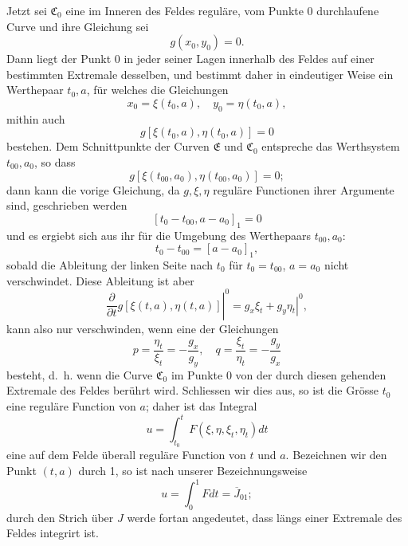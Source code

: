 \documentclass[11pt,a4paper,leqno]{article}
\begin{document}
Jetzt sei $\mathfrak{C}_0$ eine im Inneren des Feldes reguläre, vom Punkte 0 durchlaufene Curve und ihre Gleichung sei
\[
g(x_0,y_0)=0.
\]
Dann liegt der Punkt 0 in jeder seiner Lagen innerhalb des Feldes auf einer bestimmten Extremale desselben, und bestimmt daher in eindeutiger Weise ein Werthepaar $t_0,a$, für welches die Gleichungen
\[
x_0=\xi(t_0,a),\quad y_0=\eta(t_0,a),
\]
mithin auch
\[
g[\xi(t_0,a),\eta(t_0,a)]=0
\]
bestehen. Dem Schnittpunkte der Curven $\mathfrak{E}$ und $\mathfrak{C}_0$ entspreche das Werthsystem $t_{00},a_0$, so dass
\[
g[\xi(t_{00},a_0),\eta(t_{00},a_0)]=0;
\]
dann kann die vorige Gleichung, da $g,\xi,\eta$ reguläre Functionen ihrer Argumente sind, geschrieben werden
\[
[t_0-t_{00},a-a_0]_1=0
\]
und es ergiebt sich aus ihr für die Umgebung des Werthepaars $t_{00},a_0$:
\[
t_0-t_{00}=[a-a_0]_1,
\]
sobald die Ableitung der linken Seite nach $t_0$ für $t_0=t_{00}$, $a=a_0$ nicht verschwindet. Diese Ableitung ist aber
\[
\left.\frac{\partial}{\partial t}g[\xi(t,a),\eta(t,a)]\right|^0
=\left.g_x\xi_t+g_y\eta_t\right|^0,
\]
kann also nur verschwinden, wenn eine der Gleichungen
\[
p=\frac{\eta_t}{\xi_t}=-\frac{g_x}{g_y},
\quad q=\frac{\xi_t}{\eta_t}=-\frac{g_y}{g_x}
\]
besteht, d.~h. wenn die Curve $\mathfrak{C}_0$ im Punkte 0 von der durch diesen gehenden Extremale des Feldes berührt wird. Schliessen wir dies aus, so ist die Grösse $t_0$ eine reguläre Function von $a$; daher ist das Integral
\[
u=\int_{t_0}^{t}F(\xi,\eta,\xi_t,\eta_t)dt
\]
eine auf dem Felde überall reguläre Function von $t$ und $a$. Bezeichnen wir den Punkt $(t,a)$ durch 1, so ist nach unserer Bezeichnungsweise
\[
u=\int_0^1 Fdt=\overline{J}_{01};
\]
durch den Strich über $J$ werde fortan angedeutet, dass längs einer Extremale des Feldes integrirt ist.
\end{document}
